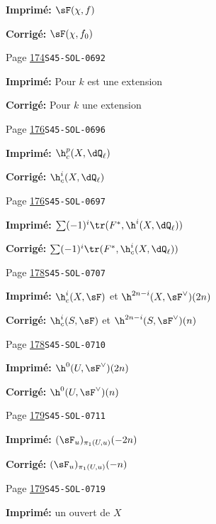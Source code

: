 \begin{description}
\par\noindent\textbf{Imprimé:} \(\sF(\chi,f)\)
\par\noindent\textbf{Corrigé:} \(\sF(\chi,f_0)\)
\smallskip
\item[\hypertarget{apparatus:FR-0140}{140}] Page \hyperlink{printpage:fr:174}{174}\quad\texttt{S45-SOL-0692}
\par\noindent\textbf{Imprimé:} Pour $k$ est une extension
\par\noindent\textbf{Corrigé:} Pour $k$ une extension
\smallskip
\item[\hypertarget{apparatus:FR-0141}{141}] Page \hyperlink{printpage:fr:176}{176}\quad\texttt{S45-SOL-0696}
\par\noindent\textbf{Imprimé:} \(\h_c^p(X,\dQ_\ell)\)
\par\noindent\textbf{Corrigé:} \(\h_c^i(X,\dQ_\ell)\)
\smallskip
\item[\hypertarget{apparatus:FR-0142}{142}] Page \hyperlink{printpage:fr:176}{176}\quad\texttt{S45-SOL-0697}
\par\noindent\textbf{Imprimé:} \(\sum (-1)^i \tr(F^\ast,\h^i(X,\dQ_\ell))\)
\par\noindent\textbf{Corrigé:} \(\sum (-1)^i \tr(F^\ast,\h_c^i(X,\dQ_\ell))\)
\smallskip
\item[\hypertarget{apparatus:FR-0143}{143}] Page \hyperlink{printpage:fr:178}{178}\quad\texttt{S45-SOL-0707}
\par\noindent\textbf{Imprimé:} $\h_c^i(X,\sF)$ et $\h^{2n-i}(X,\sF^\vee)(2n)$
\par\noindent\textbf{Corrigé:} $\h_c^i(S,\sF)$ et $\h^{2n-i}(S,\sF^\vee)(n)$
\smallskip
\item[\hypertarget{apparatus:FR-0144}{144}] Page \hyperlink{printpage:fr:178}{178}\quad\texttt{S45-SOL-0710}
\par\noindent\textbf{Imprimé:} \(\h^0(U,\sF^\vee)(2n)\)
\par\noindent\textbf{Corrigé:} \(\h^0(U,\sF^\vee)(n)\)
\smallskip
\item[\hypertarget{apparatus:FR-0145}{145}] Page \hyperlink{printpage:fr:179}{179}\quad\texttt{S45-SOL-0711}
\par\noindent\textbf{Imprimé:} \((\sF_u)_{\pi_1(U,u)}(-2n)\)
\par\noindent\textbf{Corrigé:} \((\sF_u)_{\pi_1(U,u)}(-n)\)
\smallskip
\item[\hypertarget{apparatus:FR-0146}{146}] Page \hyperlink{printpage:fr:179}{179}\quad\texttt{S45-SOL-0719}
\par\noindent\textbf{Imprimé:} un ouvert de $X$

\end{description}
